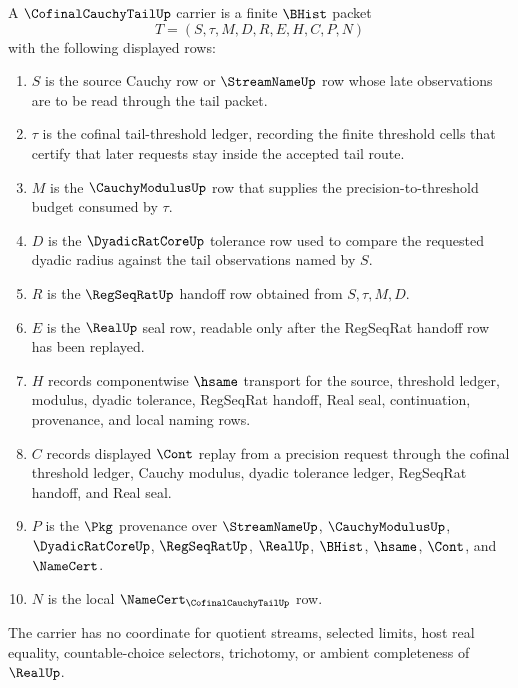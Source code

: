 \begin{definition}
\label{def:cofinal-cauchy-tail-carrier}
A $\CofinalCauchyTailUp$ carrier is a finite $\BHist$ packet
$$
T=(S,\tau,M,D,R,E,H,C,P,N)
$$
with the following displayed rows:
\begin{enumerate}
\item $S$ is the source Cauchy row or $\StreamNameUp$ row whose late observations are to be read through the tail packet.
\item $\tau$ is the cofinal tail-threshold ledger, recording the finite threshold cells that certify that later requests stay inside the accepted tail route.
\item $M$ is the $\CauchyModulusUp$ row that supplies the precision-to-threshold budget consumed by $\tau$.
\item $D$ is the $\DyadicRatCoreUp$ tolerance row used to compare the requested dyadic radius against the tail observations named by $S$.
\item $R$ is the $\RegSeqRatUp$ handoff row obtained from $S,\tau,M,D$.
\item $E$ is the $\RealUp$ seal row, readable only after the RegSeqRat handoff row has been replayed.
\item $H$ records componentwise $\hsame$ transport for the source, threshold ledger, modulus, dyadic tolerance, RegSeqRat handoff, Real seal, continuation, provenance, and local naming rows.
\item $C$ records displayed $\Cont$ replay from a precision request through the cofinal threshold ledger, Cauchy modulus, dyadic tolerance ledger, RegSeqRat handoff, and Real seal.
\item $P$ is the $\Pkg$ provenance over $\StreamNameUp$, $\CauchyModulusUp$, $\DyadicRatCoreUp$, $\RegSeqRatUp$, $\RealUp$, $\BHist$, $\hsame$, $\Cont$, and $\NameCert$.
\item $N$ is the local $\NameCert_{\CofinalCauchyTailUp}$ row.
\end{enumerate}
The carrier has no coordinate for quotient streams, selected limits, host real equality, countable-choice selectors, trichotomy, or ambient completeness of $\RealUp$.
\end{definition}

